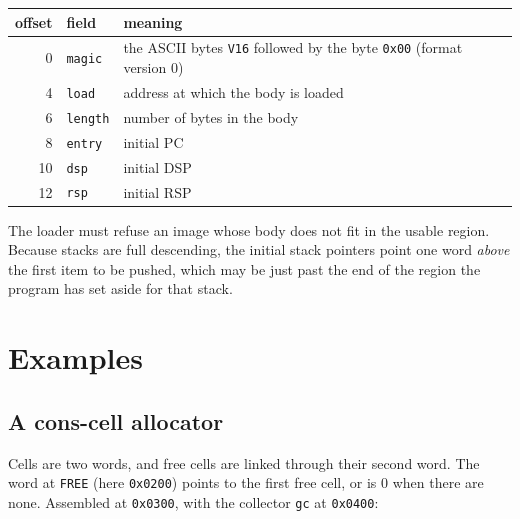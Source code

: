 \documentclass[11pt,a4paper]{article}
\newcommand{\hx}[1]{\texttt{0x#1}}
\begin{document}
\begin{center}
\small
\begin{tabular}{@{}r l l@{}}
\toprule
offset & field & meaning\\
\midrule
0 & \texttt{magic} & the ASCII bytes \texttt{V16} followed by the byte \hx{00} (format version 0)\\
4 & \texttt{load} & address at which the body is loaded\\
6 & \texttt{length} & number of bytes in the body\\
8 & \texttt{entry} & initial PC\\
10 & \texttt{dsp} & initial DSP\\
12 & \texttt{rsp} & initial RSP\\
\bottomrule
\end{tabular}
\end{center}

The loader must refuse an image whose body does not fit in the usable
region. Because stacks are full descending, the initial stack pointers point
one word \emph{above} the first item to be pushed, which may be just past the
end of the region the program has set aside for that stack.

\section{Examples}

\subsection{A cons-cell allocator}

Cells are two words, and free cells are linked through their second word.
The word at \texttt{FREE} (here \hx{0200}) points to the first free cell, or
is $0$ when there are none. Assembled at \hx{0300}, with the collector
\texttt{gc} at \hx{0400}:
\end{document}
